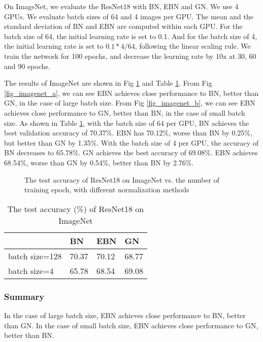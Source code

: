 \documentclass[runningheads]{llncs}
\begin{document}
On ImageNet, we evaluate the ResNet18 with BN, EBN and GN. We use 4 GPUs. We evaluate batch sizes of 64 and 4 images per GPU.   The mean and the standard deviation of BN and EBN are computed within each GPU. For the batch size of 64, the initial learning rate is set to 0.1. And for the batch size of 4, the initial learning rate is set to $0.1*4/64$, following the linear scaling rule. We train the network for 100 epochs, and decrease the learning rate by 10x at 30, 60 and 90 epochs.



The results of ImageNet are shown in Fig \ref{fig_imagenet}  and Table \ref{tab_imagenet}.  From Fig \ref{fig_imagenet_a}, we can see EBN achieves close performance to BN, better than GN, in the case of large batch size. From Fig \ref{fig_imagenet_b}, we can see EBN achieves close performance to GN, better than BN, in the case of small batch size. As shown in Table \ref{tab_imagenet}, 
with the batch size of 64 per GPU, BN achieves the best validation accuracy of 70.37\%. EBN has 70.12\%, worse than BN by 0.25\%, but better than GN by 1.35\%.  With the batch size of 4 per GPU, the accuracy of BN decreases to 65.78\%.  GN achieves the best accuracy of 69.08\%. EBN achieves 68.54\%, worse than GN by 0.54\%, better than BN by 2.76\%.


\begin{figure}[!htb]
\centering
{}
\centering
{}
\caption{The test accuracy of ResNet18 on ImageNet vs. the number of training epoch, with different normalization methods}
\label{fig_imagenet}
\end{figure}

\begin{table}[!ht]
\caption{The test accuracy (\%) of ResNet18 on ImageNet}
\label{tab_imagenet}
\centering
\begin{tabular}{l|lll}
\hline
  & BN & EBN & GN \\
\hline
batch size=128     & 70.37  & 	70.12 & 68.77     \\
batch size=4       & 65.78  & 68.54 & 69.08     \\
\hline
\end{tabular}
\end{table}

\subsubsection{Summary}  In the case of large batch size, EBN achieves close performance to BN, better than GN.  In the case of small batch size, EBN achieves close performance to GN, better than BN. 
\end{document}
